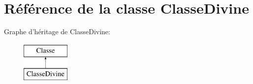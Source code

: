 \hypertarget{classClasseDivine}{\section{Référence de la classe Classe\-Divine}
\label{classClasseDivine}
}
Graphe d'héritage de Classe\-Divine\-:\begin{figure}[H]
\begin{center}
\leavevmode
\includegraphics[height=2.000000cm]{classClasseDivine}
\end{center}
\end{figure}
